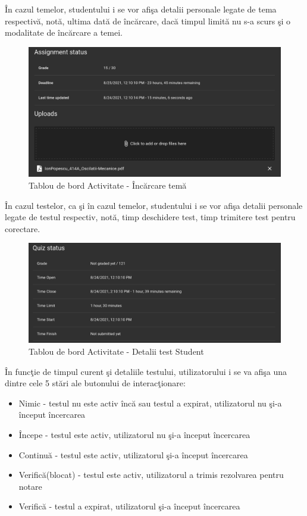 \documentclass[12pt, a4paper, oneside, romanian]{teza-upb}
\begin{document}
În cazul temelor, studentului i se vor afişa detalii personale legate de tema respectivă, notă, ultima dată de încărcare, dacă timpul limită nu s-a scurs şi o modalitate de încărcare a temei.

\begin{figure}[H]
\centering
\includegraphics*[width=\columnwidth]{tablou-de-bord-activitate-incarcare-tema}
\caption{Tablou de bord Activitate - Încărcare temă}
\label{tablou-de-bord-activitate-incarcare-tema}
\end{figure}

În cazul testelor, ca şi în cazul temelor, studentului i se vor afişa detalii personale legate de testul respectiv, notă, timp deschidere test, timp trimitere test pentru corectare.

\begin{figure}[H]
\centering
\includegraphics*[width=\columnwidth]{tablou-de-bord-activitate-detalii-test-student}
\caption{Tablou de bord Activitate - Detalii test Student}
\label{tablou-de-bord-activitate-detalii-test-student}
\end{figure}

În funcţie de timpul curent şi detaliile testului, utilizatorului i se va afişa una dintre cele 5 stări ale butonului de interacţionare:
\begin{itemize}
	\item Nimic - testul nu este activ încă sau testul a expirat, utilizatorul nu şi-a început încercarea
	\item Începe - testul este activ, utilizatorul nu şi-a început încercarea
	\item Continuă - testul este activ, utilizatorul şi-a început încercarea
	\item Verifică(blocat) - testul este activ, utilizatorul a trimis rezolvarea pentru notare
	\item Verifică - testul a expirat, utilizatorul şi-a început încercarea
\end{itemize}
\end{document}
